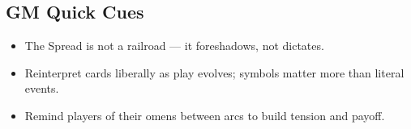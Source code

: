 \subsection{GM Quick Cues}

\begin{itemize}
  \item The Spread is not a railroad — it foreshadows, not dictates.
  \item Reinterpret cards liberally as play evolves; symbols matter more than literal events.
  \item Remind players of their omens between arcs to build tension and payoff.
\end{itemize}

